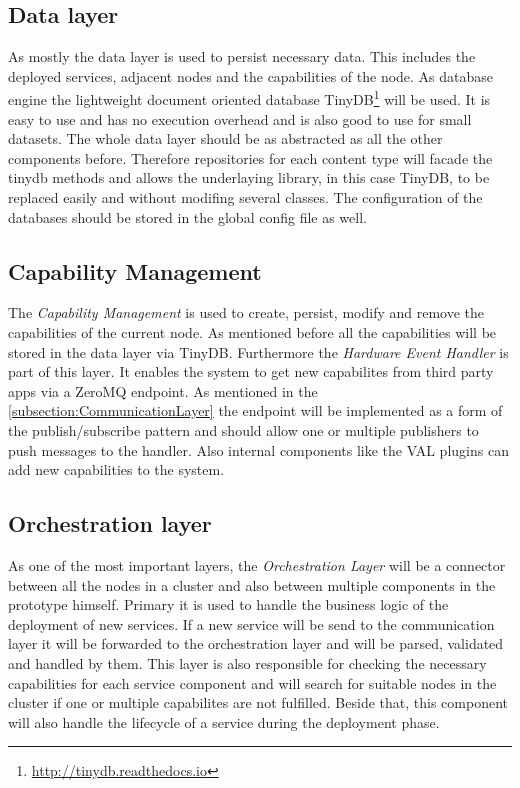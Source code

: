 \subsection{Data layer}
As mostly the data layer is used to persist necessary data.
This includes the deployed services, adjacent nodes and the capabilities of the node.
As database engine the lightweight document oriented database TinyDB\footnote{\url{http://tinydb.readthedocs.io}} will be used.
It is easy to use and has no execution overhead and is also good to use for small datasets.
The whole data layer should be as abstracted as all the other components before.
Therefore repositories for each content type will facade the tinydb methods and allows the underlaying library, in this case TinyDB, to be replaced easily and
without modifing several classes.
The configuration of the databases should be stored in the global config file as well.

\subsection{Capability Management}
The \textit{Capability Management} is used to create, persist, modify and remove the capabilities of the current node.
As mentioned before all the capabilities will be stored in the data layer via TinyDB.
Furthermore the \textit{Hardware Event Handler} is part of this layer.
It enables the system to get new capabilites from third party apps via a ZeroMQ endpoint.
As mentioned in the \ref{subsection:CommunicationLayer} the endpoint will be implemented as a form of the publish/subscribe pattern and should allow one or multiple publishers to push messages to the handler.
Also internal components like the \ac{VAL} plugins can add new capabilities to the system.

\subsection{Orchestration layer}
As one of the most important layers, the \textit{Orchestration Layer} will be a connector between all the nodes in a cluster and also between multiple components in the prototype himself.
Primary it is used to handle the business logic of the deployment of new services.
If a new service will be send to the communication layer it will be forwarded to the orchestration layer and will be parsed, validated and handled by them.
This layer is also responsible for checking the necessary capabilities for each service component and will search for suitable nodes in the cluster if one or multiple capabilites are not fulfilled.
Beside that, this component will also handle the lifecycle of a service during the deployment phase.

